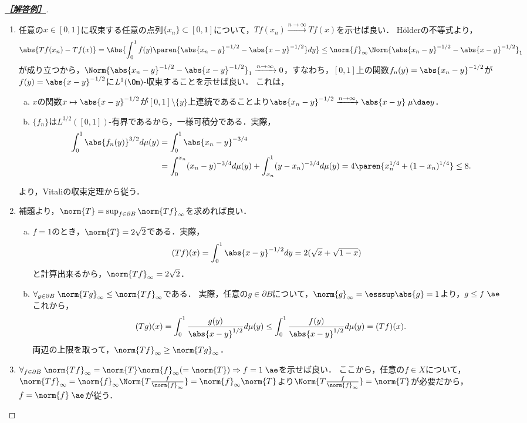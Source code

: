 \documentclass[uplatex,dvipdfmx]{jsarticle}
\begin{document}
\begin{proof}[\textbf{\underline{［解答例］}}]\mbox{}
    \begin{enumerate}
        \item 任意の$x\in[0,1]$に収束する任意の点列$\{x_n\}\subset[0,1]$について，$Tf(x_n)\xrightarrow{n\to\infty}Tf(x)$を示せば良い．
        Hölderの不等式より，
        \[\abs{Tf(x_n)-Tf(x)}=\Abs{\int^1_0f(y)\paren{\abs{x_n-y}^{-1/2}-\abs{x-y}^{-1/2}}dy}\le\norm{f}_\infty\Norm{\abs{x_n-y}^{-1/2}-\abs{x-y}^{-1/2}}_1\]
        が成り立つから，$\Norm{\abs{x_n-y}^{-1/2}-\abs{x-y}^{-1/2}}_1\xrightarrow{n\to\infty}0$，すなわち，$[0,1]$上の関数$f_n(y)=\abs{x_n-y}^{-1/2}$が$f(y)=\abs{x-y}^{-1/2}$に$L^1(\Om)$-収束することを示せば良い．
        これは，
        \begin{enumerate}[(a)]
            \item $x$の関数$x\mapsto\abs{x-y}^{-1/2}$が$[0,1]\setminus\{y\}$上連続であることより$\abs{x_n-y}^{-1/2}\xrightarrow{n\to\infty}\abs{x-y}\;\mu\dae y$．
            \item $\{f_n\}$は$L^{3/2}([0,1])$-有界であるから，一様可積分である．実際，
            \begin{align*}
                \int_0^1\abs{f_n(y)}^{3/2}d\mu(y)&=\int^1_0\abs{x_n-y}^{-3/4}\\
                &=\int^{x_n}_0(x_n-y)^{-3/4}d\mu(y)+\int^1_{x_n}(y-x_n)^{-3/4}d\mu(y)=4\paren{x_n^{1/4}+(1-x_n)^{1/4}}\le 8.
            \end{align*}
        \end{enumerate}
        より，Vitaliの収束定理から従う．
        \item 補題より，$\norm{T}=\sup_{f\in\partial B}\norm{Tf}_\infty$を求めれば良い．
        \begin{enumerate}[(a)]
            \item $f=1$のとき，$\norm{T}=2\sqrt{2}$である．実際，
            \begin{align*}
                (Tf)(x)&=\int^1_0\abs{x-y}^{-1/2}dy=2(\sqrt{x}+\sqrt{1-x})
            \end{align*}
            と計算出来るから，$\norm{Tf}_\infty=2\sqrt{2}$．
            \item $\forall_{g\in\partial B}\;\norm{Tg}_\infty\le\norm{Tf}_\infty$である．
            実際，任意の$g\in\partial B$について，$\norm{g}_\infty=\esssup\abs{g}=1$より，$g\le f\;\ae$
            これから，
            \[(Tg)(x)=\int^1_0\frac{g(y)}{\abs{x-y}^{1/2}}d\mu(y)\le\int^1_0\frac{f(y)}{\abs{x-y}^{1/2}}d\mu(y)=(Tf)(x).\]
            両辺の上限を取って，$\norm{Tf}_\infty\ge\norm{Tg}_\infty$．
        \end{enumerate}
        \item $\forall_{f\in\partial B}\;\norm{Tf}_\infty=\norm{T}\norm{f}_\infty(=\norm{T})\Rightarrow f=1\;\ae$を示せば良い．
        ここから，任意の$f\in X$について，$\norm{Tf}_\infty=\norm{f}_\infty\Norm{T\frac{f}{\norm{f}_\infty}}=\norm{f}_\infty\norm{T}$より$\Norm{T\frac{f}{\norm{f}_\infty}}=\norm{T}$が必要だから，$f=\norm{f}\;\ae$が従う．
        

\end{enumerate}
\end{proof}
\end{document}
